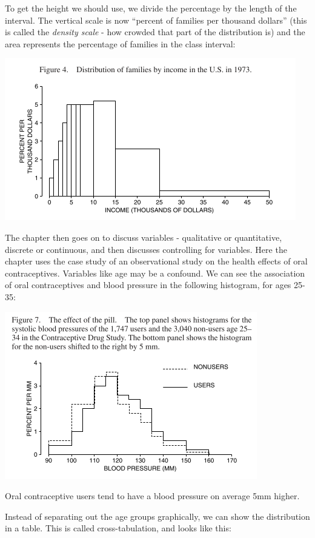 \documentclass[
]{book}
\begin{document}
To get the height we should use, we divide the percentage by the length of the interval. The vertical scale is now ``percent of families per thousand dollars'' (this is called the \emph{density scale} - how crowded that part of the distribution is) and the area represents the percentage of families in the class interval:

\includegraphics{images/Ch03Img04.png}

The chapter then goes on to discuss variables - qualitative or quantitative, discrete or continuous, and then discusses controlling for variables. Here the chapter uses the case study of an observational study on the health effects of oral contraceptives. Variables like age may be a confound. We can see the association of oral contraceptives and blood pressure in the following histogram, for ages 25-35:

\includegraphics{images/Ch03Img05.png}

Oral contraceptive users tend to have a blood pressure on average 5mm higher.

Instead of separating out the age groups graphically, we can show the distribution in a table. This is called cross-tabulation, and looks like this:
\end{document}
